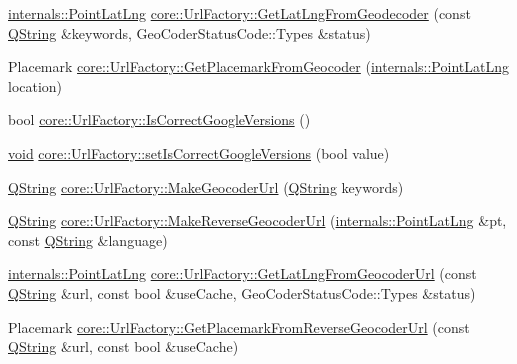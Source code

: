 \begin{DoxyCompactItemize}
\hyperlink{structinternals_1_1_point_lat_lng}{internals\-::\-Point\-Lat\-Lng} \hyperlink{group___o_p_map_widget_ga39ab1784711725813c6e90f8be8557b5}{core\-::\-Url\-Factory\-::\-Get\-Lat\-Lng\-From\-Geodecoder} (const \hyperlink{group___u_a_v_objects_plugin_gab9d252f49c333c94a72f97ce3105a32d}{\-Q\-String} \&keywords, \-Geo\-Coder\-Status\-Code\-::\-Types \&status)
\item 
\-Placemark \hyperlink{group___o_p_map_widget_ga3490a9f0d7fad2058ec2e9a04e7c7f4e}{core\-::\-Url\-Factory\-::\-Get\-Placemark\-From\-Geocoder} (\hyperlink{structinternals_1_1_point_lat_lng}{internals\-::\-Point\-Lat\-Lng} location)
\item 
bool \hyperlink{group___o_p_map_widget_ga5ccccf5ffb4b44422b6ca9596d0972f9}{core\-::\-Url\-Factory\-::\-Is\-Correct\-Google\-Versions} ()
\item 
\hyperlink{group___u_a_v_objects_plugin_ga444cf2ff3f0ecbe028adce838d373f5c}{void} \hyperlink{group___o_p_map_widget_ga7770edaf0b058ba1317da2a627219fb1}{core\-::\-Url\-Factory\-::set\-Is\-Correct\-Google\-Versions} (bool value)
\item 
\hyperlink{group___u_a_v_objects_plugin_gab9d252f49c333c94a72f97ce3105a32d}{\-Q\-String} \hyperlink{group___o_p_map_widget_ga972a8b02da4bbabc676cf8c0aecff2da}{core\-::\-Url\-Factory\-::\-Make\-Geocoder\-Url} (\hyperlink{group___u_a_v_objects_plugin_gab9d252f49c333c94a72f97ce3105a32d}{\-Q\-String} keywords)
\item 
\hyperlink{group___u_a_v_objects_plugin_gab9d252f49c333c94a72f97ce3105a32d}{\-Q\-String} \hyperlink{group___o_p_map_widget_gad12026ac0e1b17ce9cdbd8da9b4521db}{core\-::\-Url\-Factory\-::\-Make\-Reverse\-Geocoder\-Url} (\hyperlink{structinternals_1_1_point_lat_lng}{internals\-::\-Point\-Lat\-Lng} \&pt, const \hyperlink{group___u_a_v_objects_plugin_gab9d252f49c333c94a72f97ce3105a32d}{\-Q\-String} \&language)
\item 
\hyperlink{structinternals_1_1_point_lat_lng}{internals\-::\-Point\-Lat\-Lng} \hyperlink{group___o_p_map_widget_ga5fcebca86495c19cd0feda82e7bb756d}{core\-::\-Url\-Factory\-::\-Get\-Lat\-Lng\-From\-Geocoder\-Url} (const \hyperlink{group___u_a_v_objects_plugin_gab9d252f49c333c94a72f97ce3105a32d}{\-Q\-String} \&url, const bool \&use\-Cache, \-Geo\-Coder\-Status\-Code\-::\-Types \&status)
\item 
\-Placemark \hyperlink{group___o_p_map_widget_ga6f4535cb1c90494c811786af2dbac194}{core\-::\-Url\-Factory\-::\-Get\-Placemark\-From\-Reverse\-Geocoder\-Url} (const \hyperlink{group___u_a_v_objects_plugin_gab9d252f49c333c94a72f97ce3105a32d}{\-Q\-String} \&url, const bool \&use\-Cache)

\end{DoxyCompactItemize}
